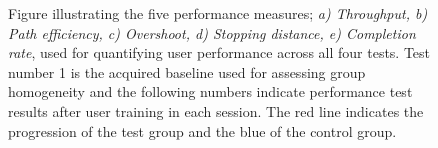 \begin{figure}[H] 
	\hspace{-0.5cm}
	\hspace{-0.5cm}
	\hspace{-0.5cm}
	\hspace{-0.5cm}
	\caption{Figure illustrating the five performance measures; \textit{ a) Throughput, b) Path efficiency, c) Overshoot, d) Stopping distance, e) Completion rate}, used for quantifying user performance across all four tests.  Test number 1 is the acquired baseline used for assessing group homogeneity and the following numbers indicate performance test results after user training in each session. The red line indicates the progression of the test group and the blue of the control group.}
	\label{thereIsnoFigRefYet}
	
\end{figure}
	
